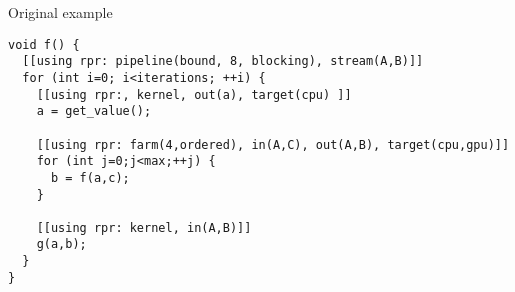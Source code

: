 \begin{frame}[t,fragile]{Original example}
\begin{lstlisting}[basicstyle=\footnotesize]
void f() {
  [[using rpr: pipeline(bound, 8, blocking), stream(A,B)]]
  for (int i=0; i<iterations; ++i) {
    [[using rpr:, kernel, out(a), target(cpu) ]]
    a = get_value();
    
    [[using rpr: farm(4,ordered), in(A,C), out(A,B), target(cpu,gpu)]]
    for (int j=0;j<max;++j) {
      b = f(a,c);
    }

    [[using rpr: kernel, in(A,B)]]
    g(a,b);
  }
}
\end{lstlisting}
\end{frame}
